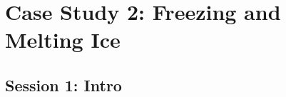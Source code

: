 \documentclass[a4paper,openany,nobib]{tufte-book}
\begin{document}
\thispagestyle{empty}
\chapter{Case Study 2: Freezing and Melting Ice} 
\setcounter{page}{1}
\section{Session 1: Intro}%
\label{sec:Session 1:}
\end{document}
